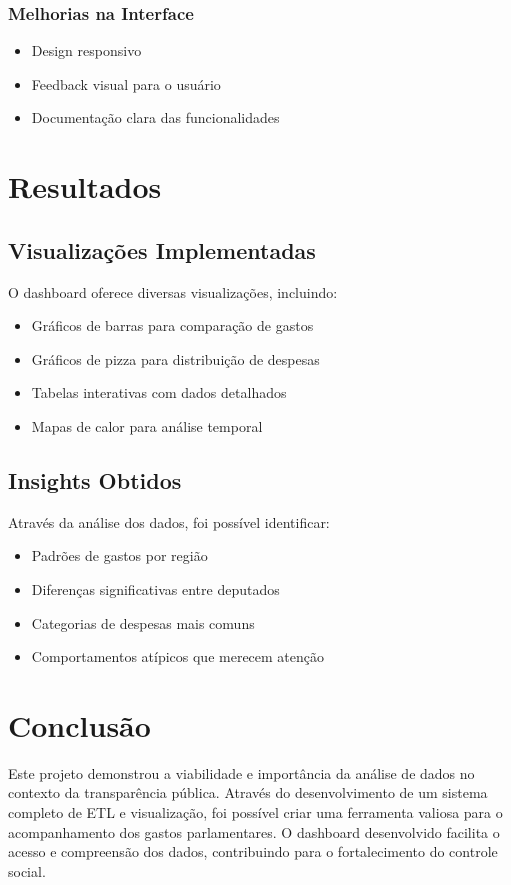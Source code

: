 \documentclass[12pt,a4paper]{article}
\begin{document}
\subsubsection{Melhorias na Interface}
\begin{itemize}
    \item Design responsivo
    \item Feedback visual para o usuário
    \item Documentação clara das funcionalidades
\end{itemize}

\section{Resultados}
\subsection{Visualizações Implementadas}
O dashboard oferece diversas visualizações, incluindo:
\begin{itemize}
    \item Gráficos de barras para comparação de gastos
    \item Gráficos de pizza para distribuição de despesas
    \item Tabelas interativas com dados detalhados
    \item Mapas de calor para análise temporal
\end{itemize}

\subsection{Insights Obtidos}
Através da análise dos dados, foi possível identificar:
\begin{itemize}
    \item Padrões de gastos por região
    \item Diferenças significativas entre deputados
    \item Categorias de despesas mais comuns
    \item Comportamentos atípicos que merecem atenção
\end{itemize}

\section{Conclusão}
Este projeto demonstrou a viabilidade e importância da análise de dados no contexto da transparência pública. Através do desenvolvimento de um sistema completo de ETL e visualização, foi possível criar uma ferramenta valiosa para o acompanhamento dos gastos parlamentares. O dashboard desenvolvido facilita o acesso e compreensão dos dados, contribuindo para o fortalecimento do controle social.
\end{document}
